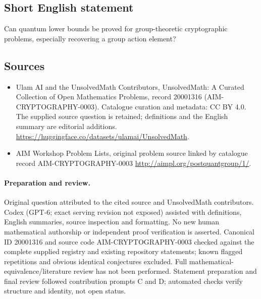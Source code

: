 \documentclass[11pt]{article}
\begin{document}
\subsection{Short English statement}
Can quantum lower bounds be proved for group-theoretic cryptographic problems, especially recovering a group action element?
\subsection{Sources}
\begin{itemize}
\item[\hypertarget{source:20001316:1}{S1}] Ulam AI and the UnsolvedMath Contributors, UnsolvedMath: A Curated Collection of Open Mathematics Problems, record 20001316 (AIM-CRYPTOGRAPHY-0003). Catalogue curation and metadata: CC BY 4.0. The supplied source question is retained; definitions and the English summary are editorial additions.
\url{https://huggingface.co/datasets/ulamai/UnsolvedMath}.
\item[\hypertarget{source:20001316:2}{S2}] AIM Workshop Problem Lists, original problem source linked by catalogue record AIM-CRYPTOGRAPHY-0003
\url{http://aimpl.org/postquantgroup/1/}.
\end{itemize}
\paragraph{Preparation and review.}
Original question attributed to the cited source and UnsolvedMath contributors. Codex (GPT-6; exact serving revision not exposed) assisted with definitions, English summaries, source inspection and formatting. No new human mathematical authorship or independent proof verification is asserted. Canonical ID 20001316 and source code AIM-CRYPTOGRAPHY-0003 checked against the complete supplied registry and existing repository statements; known flagged repetitions and obvious identical conjectures excluded. Full mathematical-equivalence/literature review has not been performed. Statement preparation and final review followed contribution prompts C and D; automated checks verify structure and identity, not open status.
\label{end:20001316}
\end{document}
